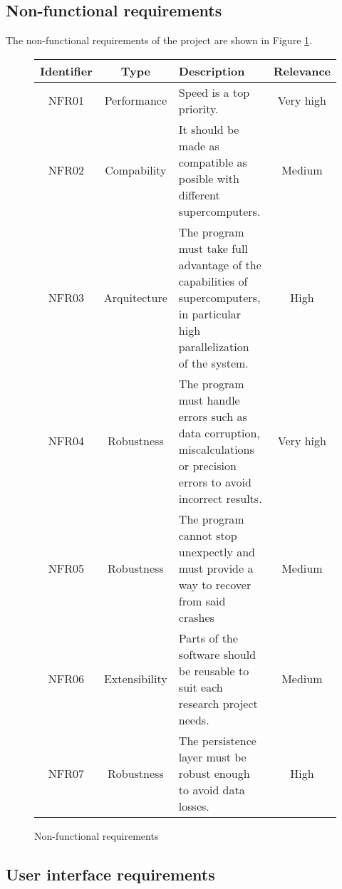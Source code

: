 \subsection{Non-functional requirements}

The non-functional requirements of the project are shown in Figure
\ref{non_functional:fig}.

\begin{figure}[ht!]

  \begin{center}

    \begin{tabular}{||c | c | p{7cm} | c||}

    \hline
    Identifier & Type  & Description & Relevance\\
    \hline
    \hline
    NFR01 \label{NFR01} & Performance & Speed is a top priority. &
    Very high\\
    \hline
    NFR02 \label{NFR02} & Compability & It should be made as
    compatible as posible with different supercomputers. &
    Medium \\
    \hline
    NFR03 \label{NFR04} & Arquitecture & The program must take full advantage
    of the capabilities of supercomputers, in particular  high parallelization of
    the system. & High\\
    \hline
    NFR04 \label{NFR05} & Robustness & The program must handle errors such as
    data corruption, miscalculations or precision errors to avoid incorrect
    results. & Very high \\
    \hline
    NFR05 \label{NFR06} & Robustness & The program cannot stop unexpectly
    and must provide a way to recover from said crashes & Medium \\
    \hline
    NFR06 \label{NFR07} & Extensibility & Parts of the software should be reusable
    to suit each research project needs. & Medium \\
    \hline
    NFR07 \label{NFR09} & Robustness & The persistence layer must be robust
    enough to avoid data losses. & High \\
    \hline

    \end{tabular}

  \end{center}

  \caption{Non-functional requirements}
  \label{non_functional:fig}
\end{figure}

\subsection{User interface requirements}

